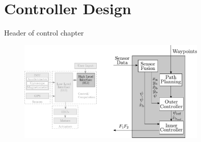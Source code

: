 \chapter{Controller Design}

Header of control chapter

\begin{figure}[H]
    \includegraphics[width=0.8\textwidth]{figures/controllerDiagram}
    \caption{}
    \label{fig:controllerDiagram}
\end{figure}